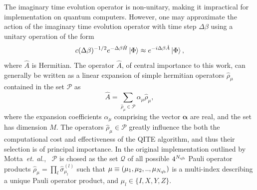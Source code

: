 \documentclass[aip,jcp,amsmath,amssymb, reprint]{revtex4-1}
\providecommand{\norm}[1]{\lVert#1\rVert}
\begin{document}
The imaginary time evolution operator is non-unitary, making it impractical for implementation on quantum computers.
However, one may approximate the action of the imaginary time evolution operator with time step $\Delta \beta$ using a unitary operation of the form  
\begin{equation}
 c(\Delta \beta)^{-1/2} e^{-\Delta \beta \hat{H} } \ket{\Phi} \approx e^{-i \Delta \beta \hat{A} } \ket{\Phi},
\end{equation}
where $\hat{A}$ is Hermitian. 
The operator $\hat{A}$, of central importance to this work, can generally be written as a linear expansion of simple hermitian operators $\hat{\rho}_\mu$ contained in the set $\mathcal{P}$ as
\begin{equation}
\hat{A} = \sum_{\hat{\rho}_\mu \in \mathcal{P}} \alpha_\mu \hat{\rho}_\mu,
\end{equation} 
where the expansion coefficients $\alpha_\mu$ comprising the vector $\boldsymbol{\alpha}$ are real, and the set has dimension $M$.
The operators $\hat{\rho}_\mu \in \mathcal{P}$ greatly influence the both the computational cost and effectiveness of the QITE algorithm, and thus their selection is of principal importance.  
In the original implementation outlined by Motta~\textit{et. al.},~\cite{motta2019determining} $\mathcal{P}$ is chosed as the set $\mathcal{Q}$ of all possible $4^{N_{\rm{qb}}}$ Pauli operator products $\hat{ \rho}_\mu  = \prod_l \hat{\sigma}_{\mu_l}^{(l)}$ such that $\mu \equiv (\mu_1, \mu_2, .., \mu_{N_{\rm{qb}}}) $ is a multi-index describing a unique Pauli operator product, and $\mu_l \in \{ I, X, Y, Z \}$.
\end{document}
